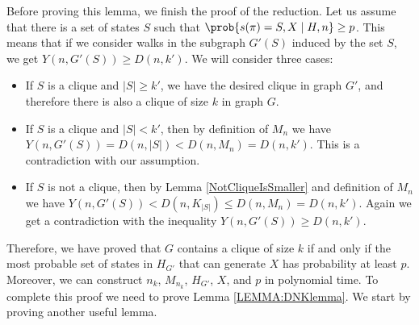 Before proving this lemma, we finish the proof of the reduction. Let
us assume that there is a set of states $S$ such that
$\prob{s(\pi)=S,X \mid H,n}\ge p$. This means that if we consider walks in the
subgraph $G'(S)$ induced by the set $S$, we get $Y(n,G'(S))\ge
D(n,k')$. We will consider three cases:
\begin{itemize}
\item If $S$ is a clique and $|S|\ge k'$, we have the desired clique in 
graph $G'$, and therefore there is also a clique of size $k$ in graph $G$. 
\item If $S$ is a clique and $|S|<k'$, then by definition of $M_n$ we have 
$Y(n,G'(S))=D(n,|S|)<D(n,M_n) = 
D(n,k')$. This is a contradiction with our assumption. 
\item If $S$ is not a clique, then by Lemma \ref{NotCliqueIsSmaller}
  and definition of $M_n$ we have $Y(n,G'(S)) < D(n, K_{|S|}) \le
  D(n,M_n) = D(n,k')$. Again we get a contradiction with 
the inequality $Y(n,G'(S))\ge D(n,k')$.
\end{itemize}
Therefore, we have proved that $G$ contains a clique of size $k$ if and
only if the most probable set of states in $H_{G'}$ that can generate $X$ has
probability at least $p$. Moreover, we can construct $n_k$, $M_{n_k}$,
$H_{G'}$, $X$, and $p$ in polynomial time.
To complete this proof we need to prove Lemma \ref{LEMMA:DNKlemma}.  We
start by proving another useful lemma.

